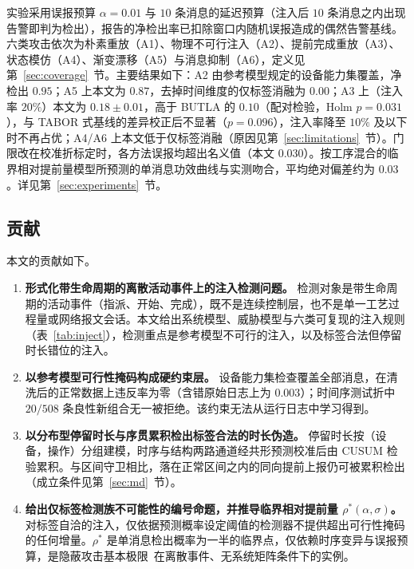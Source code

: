\documentclass[manuscript,screen,review]{acmart}
\begin{document}
实验采用误报预算 $\alpha=0.01$ 与 $10$ 条消息的延迟预算（注入后 $10$ 条消息之内出现告警即判为检出），报告的净检出率已扣除窗口内随机误报造成的偶然告警基线。六类攻击依次为朴素重放（{A1}）、物理不可行注入（{A2}）、提前完成重放（{A3}）、状态模仿（{A4}）、渐变漂移（{A5}）与消息抑制（{A6}），定义见第~\ref{sec:coverage}~节。主要结果如下：{A2} 由参考模型规定的设备能力集覆盖，净检出 $0.95$；{A5} 上本文为 $0.87$，去掉时间维度的仅标签消融为 $0.00$；{A3} 上（注入率 $20\%$）本文为 $0.18{\pm}0.01$，高于 {BUTLA} 的 $0.10$（配对检验，{Holm} $p=0.031$），与 {TABOR} 式基线的差异校正后不显著（$p=0.096$），注入率降至 $10\%$ 及以下时不再占优；{A4}/{A6} 上本文低于仅标签消融（原因见第~\ref{sec:limitations}~节）。门限改在校准折标定时，各方法误报均超出名义值（本文 $0.030$）。按工序混合的临界相对提前量模型所预测的单消息功效曲线与实测吻合，平均绝对偏差约为 $0.03$。详见第~\ref{sec:experiments}~节。

\subsection{贡献}
\label{sec:intro_contrib}

本文的贡献如下。
\begin{enumerate}
\item \textbf{形式化带生命周期的离散活动事件上的注入检测问题。}
检测对象是带生命周期的活动事件（指派、开始、完成），既不是连续控制层，也不是单一工艺过程量或网络报文会话。本文给出系统模型、威胁模型与六类可复现的注入规则（表~\ref{tab:inject}），检测重点是参考模型不可行的注入，以及标签合法但停留时长错位的注入。
\item \textbf{以参考模型可行性掩码构成硬约束层。}
设备能力集检查覆盖全部消息，在清洗后的正常数据上违反率为零（含错原始日志上为 $0.003$）；时间序测试折中 $20/508$ 条良性新组合无一被拒绝。该约束无法从运行日志中学习得到。
\item \textbf{以分布型停留时长与序贯累积检出标签合法的时长伪造。}
停留时长按（设备，操作）分组建模，时序与结构两路通道经共形预测校准后由 {CUSUM} 检验累积。与区间守卫相比，落在正常区间之内的同向提前上报仍可被累积检出（成立条件见第~\ref{sec:md}~节）。
\item \textbf{给出仅标签检测族不可能性的编号命题，并推导临界相对提前量 $\rho^*(\alpha,\sigma)$。}
对标签自洽的注入，仅依据预测概率设定阈值的检测器不提供超出可行性掩码的任何增量。$\rho^*$ 是单消息检出概率为一半的临界点，仅依赖时序变异与误报预算，是隐蔽攻击基本极限~\cite{liu2022limits}在离散事件、无系统矩阵条件下的实例。
\end{enumerate}
\end{document}
